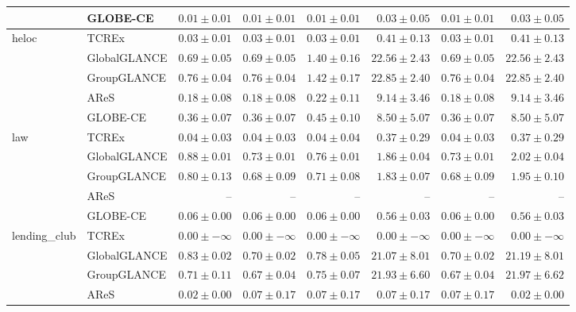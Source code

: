 \begin{table}[ht]
\begin{center}
\begin{sc}
\begin{scriptsize}
\begin{tabular}{l|l|rrrrrr}
 & GLOBE-CE & $0.01\pm{0.01}$ & $0.01\pm{0.01}$ & $0.01\pm{0.01}$ & $0.03\pm{0.05}$ & $0.01\pm{0.01}$ & $0.03\pm{0.05}$ \\
\midrule
\multirow{5}{*}{heloc} & TCREx & $\boldsymbol{0.03\pm{0.01}}$ & $\boldsymbol{0.03\pm{0.01}}$ & $\boldsymbol{0.03\pm{0.01}}$ & $\boldsymbol{0.41\pm{0.13}}$ & $\boldsymbol{0.03\pm{0.01}}$ & $\boldsymbol{0.41\pm{0.13}}$ \\
 & GlobalGLANCE & $0.69\pm{0.05}$ & $0.69\pm{0.05}$ & $1.40\pm{0.16}$ & $22.56\pm{2.43}$ & $0.69\pm{0.05}$ & $22.56\pm{2.43}$ \\
 & GroupGLANCE & $0.76\pm{0.04}$ & $0.76\pm{0.04}$ & $1.42\pm{0.17}$ & $22.85\pm{2.40}$ & $0.76\pm{0.04}$ & $22.85\pm{2.40}$ \\
 & AReS & $0.18\pm{0.08}$ & $0.18\pm{0.08}$ & $0.22\pm{0.11}$ & $9.14\pm{3.46}$ & $0.18\pm{0.08}$ & $9.14\pm{3.46}$ \\
 & GLOBE-CE & $0.36\pm{0.07}$ & $0.36\pm{0.07}$ & $0.45\pm{0.10}$ & $8.50\pm{5.07}$ & $0.36\pm{0.07}$ & $8.50\pm{5.07}$ \\
\midrule
\multirow{5}{*}{law} & TCREx & $\boldsymbol{0.04\pm{0.03}}$ & $\boldsymbol{0.04\pm{0.03}}$ & $\boldsymbol{0.04\pm{0.04}}$ & $\boldsymbol{0.37\pm{0.29}}$ & $\boldsymbol{0.04\pm{0.03}}$ & $\boldsymbol{0.37\pm{0.29}}$ \\
 & GlobalGLANCE & $0.88\pm{0.01}$ & $0.73\pm{0.01}$ & $0.76\pm{0.01}$ & $1.86\pm{0.04}$ & $0.73\pm{0.01}$ & $2.02\pm{0.04}$ \\
 & GroupGLANCE & $0.80\pm{0.13}$ & $0.68\pm{0.09}$ & $0.71\pm{0.08}$ & $1.83\pm{0.07}$ & $0.68\pm{0.09}$ & $1.95\pm{0.10}$ \\
 & AReS & -- & -- & -- & -- & -- & -- \\
 & GLOBE-CE & $0.06\pm{0.00}$ & $0.06\pm{0.00}$ & $0.06\pm{0.00}$ & $0.56\pm{0.03}$ & $0.06\pm{0.00}$ & $0.56\pm{0.03}$ \\
\midrule
\multirow{5}{*}{lending\_club} & TCREx & $\boldsymbol{0.00\pm{-\infty}}$ & $\boldsymbol{0.00\pm{-\infty}}$ & $\boldsymbol{0.00\pm{-\infty}}$ & $\boldsymbol{0.00\pm{-\infty}}$ & $\boldsymbol{0.00\pm{-\infty}}$ & $\boldsymbol{0.00\pm{-\infty}}$ \\
 & GlobalGLANCE & $0.83\pm{0.02}$ & $0.70\pm{0.02}$ & $0.78\pm{0.05}$ & $21.07\pm{8.01}$ & $0.70\pm{0.02}$ & $21.19\pm{8.01}$ \\
 & GroupGLANCE & $0.71\pm{0.11}$ & $0.67\pm{0.04}$ & $0.75\pm{0.07}$ & $21.93\pm{6.60}$ & $0.67\pm{0.04}$ & $21.97\pm{6.62}$ \\
 & AReS & $0.02\pm{0.00}$ & $0.07\pm{0.17}$ & $0.07\pm{0.17}$ & $0.07\pm{0.17}$ & $0.07\pm{0.17}$ & $0.02\pm{0.00}$ \\

\end{tabular}
\end{scriptsize}
\end{sc}
\end{center}
\end{table}
